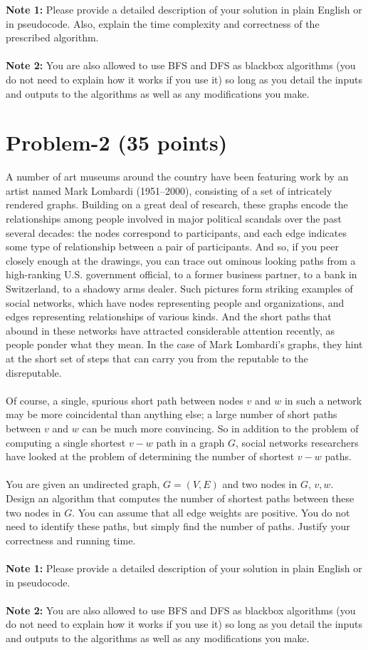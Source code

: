 \documentclass[11pt]{article}
\begin{document}
\noindent
\textbf{Note 1:} Please provide a detailed description of your solution in plain English or in pseudocode. Also, explain the time complexity and correctness of the prescribed algorithm.\\ \\
\textbf{Note 2:} You are also allowed to use BFS and DFS as blackbox algorithms (you do not need to explain how it works if you use it) so long as you detail the inputs and outputs to the algorithms as well as any modifications you make.​


\newpage
\section*{Problem-2 (35 points)}
A number of art museums around the country have been featuring work by an artist named Mark Lombardi (1951–2000), consisting of a set of intricately rendered graphs. Building on a great deal of research, these graphs encode the relationships among people involved in major political scandals over the past several decades: the nodes correspond to participants, and each edge indicates some type of relationship between a pair of participants. And so, if you peer closely enough at the drawings, you can trace out ominous looking paths from a high-ranking U.S. government official, to a former business partner, to a bank in Switzerland, to a shadowy arms dealer.
Such pictures form striking examples of social networks, which have nodes representing people and organizations, and edges representing relationships of various kinds. And the short paths that abound in these networks have attracted considerable attention recently, as people ponder what they mean. In the case of Mark Lombardi’s graphs, they hint at the short set of steps that can carry you from the reputable to the disreputable. \\ \\
\noindent
Of course, a single, spurious short path between nodes $v$ and $w$ in such a network may be more coincidental than anything else; a large number of short paths between $v$ and $w$ can be much more convincing. So in addition to the problem of computing a single shortest $v-w$ path in a graph $G$, social networks researchers have looked at the problem of determining the number of shortest $v-w$ paths. \\ \\
\noindent
You are given an undirected graph, $G = (V, E)$ and two nodes in $G$, $v, w$. Design an algorithm that computes the number of shortest paths between these two nodes in $G$. You can assume that all edge weights are positive. You do not need to identify these paths, but simply find the number of paths. Justify your correctness and running time.  \\ \\
\textbf{Note 1:} Please provide a detailed description of your solution in plain English or in pseudocode. \\ \\
\textbf{Note 2:} You are also allowed to use BFS and DFS as blackbox algorithms (you do not need to explain how it works if you use it) so long as you detail the inputs and outputs to the algorithms as well as any modifications you make.​
\
\end{document}
